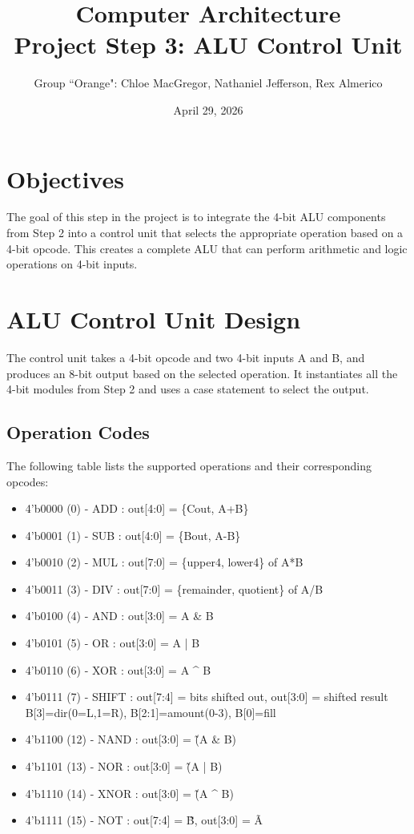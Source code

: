 \documentclass[11pt]{article}
\title{\textbf{Computer Architecture}\\[0.5em]
    \large Project Step 3: ALU Control Unit}
\author{Group ``Orange": Chloe MacGregor, Nathaniel Jefferson, Rex Almerico}
\date{April 29, 2026}
\begin{document}
\maketitle
\thispagestyle{empty}

\section{Objectives}
The goal of this step in the project is to integrate the 4-bit ALU components from Step 2 into a control unit that selects the appropriate operation based on a 4-bit opcode. This creates a complete ALU that can perform arithmetic and logic operations on 4-bit inputs.

\section{ALU Control Unit Design}
The control unit takes a 4-bit opcode and two 4-bit inputs A and B, and produces an 8-bit output based on the selected operation. It instantiates all the 4-bit modules from Step 2 and uses a case statement to select the output.

\subsection{Operation Codes}
The following table lists the supported operations and their corresponding opcodes:

\begin{itemize}
\item 4'b0000 (0)  - ADD   : out[4:0]  = \{Cout, A+B\}
\item 4'b0001 (1)  - SUB   : out[4:0]  = \{Bout, A-B\}
\item 4'b0010 (2)  - MUL   : out[7:0]  = \{upper4, lower4\} of A*B
\item 4'b0011 (3)  - DIV   : out[7:0]  = \{remainder, quotient\} of A/B
\item 4'b0100 (4)  - AND   : out[3:0]  = A \& B
\item 4'b0101 (5)  - OR    : out[3:0]  = A | B
\item 4'b0110 (6)  - XOR   : out[3:0]  = A \^{} B
\item 4'b0111 (7)  - SHIFT : out[7:4]  = bits shifted out, out[3:0] = shifted result \\
                          B[3]=dir(0=L,1=R), B[2:1]=amount(0-3), B[0]=fill
\item 4'b1100 (12) - NAND  : out[3:0]  = \~(A \& B)
\item 4'b1101 (13) - NOR   : out[3:0]  = \~(A | B)
\item 4'b1110 (14) - XNOR  : out[3:0]  = \~(A \^{} B)
\item 4'b1111 (15) - NOT   : out[7:4]  = \~B,  out[3:0] = \~A
\end{itemize}
\end{document}
